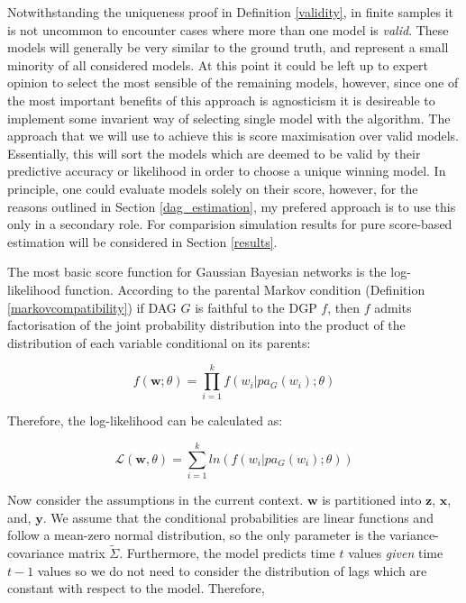 \documentclass{article}
\begin{document}
Notwithstanding the uniqueness proof in Definition \ref{validity}, in finite samples it is not uncommon to encounter cases where more than one model is \textit{valid}. These models will generally be very similar to the ground truth, and represent a small minority of all considered models. At this point it could be left up to expert opinion to select the most sensible of the remaining models, however, since one of the most important benefits of this approach is agnosticism it is desireable to implement some invarient way of selecting single model with the algorithm. The approach that we will use to achieve this is score maximisation over valid models. Essentially, this will sort the models which are deemed to be valid by their predictive accuracy or likelihood in order to choose a unique winning model. In principle, one could evaluate models solely on their score, however, for the reasons outlined in Section \ref{dag_estimation}, my prefered approach is to use this only in a secondary role. For comparision simulation results for pure score-based estimation will be  considered in Section \ref{results}.

The most basic score function for Gaussian Bayesian networks is the log-likelihood function. According to the parental Markov condition (Definition \ref{markovcompatibility}) if DAG $G$ is faithful to the DGP $f$, then $f$ admits factorisation of the joint probability distribution into the product of the distribution of each variable conditional on its parents:

\begin{equation}
  f(\mathbf{w};\theta) = \prod_{i=1}^{k} f(w_i | pa_G(w_i);\theta)
\end{equation}

Therefore, the log-likelihood can be calculated as:

\begin{equation}
  \mathcal{L}(\mathbf{w},\theta) = \sum_{i=1}^{k} ln(f(w_i | pa_G(w_i);\theta))
\end{equation}

Now consider the assumptions in the current context. $\mathbf{w}$ is partitioned into $\mathbf{z}$, $\mathbf{x}$, and, $\mathbf{y}$. We assume that the conditional probabilities are linear functions and follow a mean-zero normal distribution, so the only parameter is the variance-covariance matrix $\tilde{\Sigma}$. Furthermore, the model predicts time $t$ values \textit{given} time $t-1$ values so we do not need to consider the distribution of lags which are constant with respect to the model. Therefore,
\end{document}
